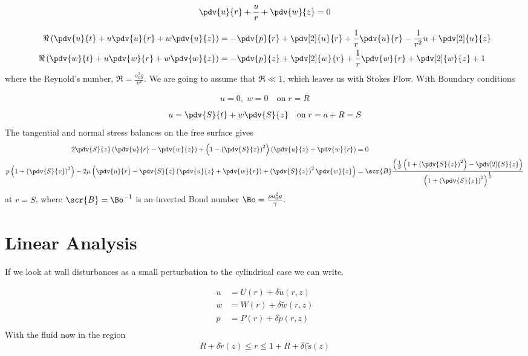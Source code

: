 \documentclass[12pt]{article}
\begin{document}
\begin{align}
\pdv{ u}{ r}+\frac{ u}{ r}+\pdv{ w}{ z}=0 \label{continuityn}
\end{align}

\begin{align}
\Re\left(\pdv{ u}{ t}+ u\pdv{ u}{ r}+ w\pdv{ u}{ z}\right)&=-\pdv{ p}{ r}+\pdv[2]{ u}{ r}+\frac{1}{ r}\pdv{ u}{ r}-\frac{1}{r^2} u+\pdv[2]{ u}{ z}\label{navierrn}\\
\Re\left(\pdv{ w}{ t}+u\pdv{ w}{ r}+ w\pdv{ w}{ z}\right)&=-\pdv{ p}{ z}+\pdv[2]{ w}{ r}+\frac{1}{ r}\pdv{ w}{ r}+\pdv[2]{ w}{ z}+ 1 \label{naviervn}
\end{align}
where the Reynold's number, $\Re=\frac{a_0^3 g}{\nu^2}$. We are going to assume that $\Re\ll 1$, which leaves us with Stokes Flow. With Boundary conditions 

\begin{align}
 u=0,\;  w=0\quad\mathrm{on}\;  r= R \label{solidboundaryn}
\end{align}
\begin{align}
   u=\pdv{ S}{ t}+ w\pdv{ S}{ z} \quad\mathrm{on}\;  r= a + R =S \label{kinematicn}
\end{align}
The tangential and normal stress balances on the free surface gives
\footnotesize
\begin{align}
2\pdv{ S}{ z}\left(\pdv{ u}{ r}-\pdv{ w}{ z}\right)+\left(1-\left(\pdv{ S}{ z}\right)^2\right)\left(\pdv{ u}{ z}+\pdv{ w}{ r}\right)&=0\label{tangstressn}\\
 p\left(1+\left(\pdv{ S}{ z}\right)^2\right)-2\mu\left( \pdv{ u}{ r}-\pdv{ S}{ z}\left(\pdv{ u}{ z}+\pdv{ w}{ r}\right)+\left(\pdv{ S}{ z}\right)^2\pdv{ w}{ z}\right)&=\scr{B}\frac{\left(\frac{1}{ S}\left(1+\left(\pdv{ S}{ z}\right)^2\right)-\pdv[2]{ S}{ z}\right)}{\left(1+\left(\pdv{ S}{ z}\right)^2\right)^{\frac{1}{2}}}\label{normstressn}
\end{align}
\normalsize
at $ r= S$, where $\scr{B}=\Bo^{-1}$ is an inverted Bond number $\Bo =\frac{\rho a_0^2 g}{\gamma}.$
\section{Linear Analysis}
If we look at wall disturbances as a small perturbation to the cylindrical case we can write.

\begin{align}
u&=U(r)+\delta \tilde u(r,z)\label{eq:perturbtop}\\
w&=W(r)+\delta\tilde w(r,z)\\
p&=P(r)+\delta\tilde p(r,z)\\
\end{align}
With the fluid now in the region
\begin{align}
R+\delta\tilde r(z)\leq r\leq 1+R+\delta (\tilde s(z) \label{eq:perturbbottom}
\end{align}
\end{document}
